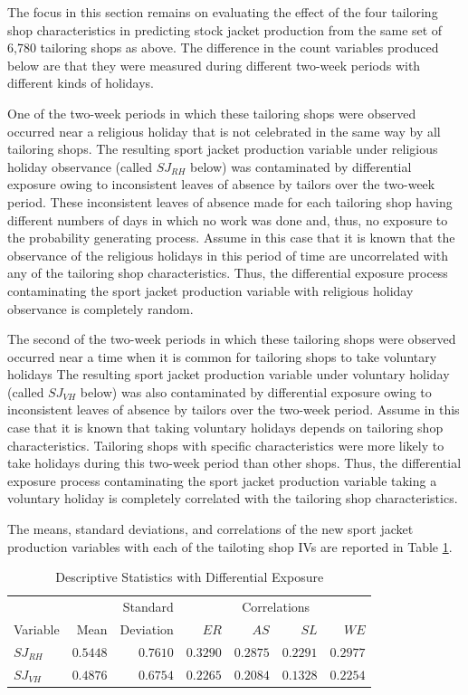 \documentclass[ShortAfour,times,sageapa]{sagej}
\begin{document}
	The focus in this section remains on evaluating the effect of the four tailoring shop characteristics in predicting stock jacket production from the same set of 6,780 tailoring shops as above. 
	The difference in the count variables produced below are that they were measured during different two-week periods with different kinds of holidays.
	
	One of the two-week periods in which these tailoring shops were observed occurred near a religious holiday that is not celebrated in the same way by all tailoring shops.
	The resulting sport jacket production variable under religious holiday observance (called $SJ_{RH}$ below) was contaminated by differential exposure owing to inconsistent leaves of absence by tailors over the two-week period.
	These inconsistent leaves of absence made for each tailoring shop having different numbers of days in which no work was done and, thus, no exposure to the probability generating process.
	Assume in this case that it is known that the observance of the religious holidays in this period of time are uncorrelated with any of the tailoring shop characteristics. 
	Thus, the differential exposure process contaminating the sport jacket production variable with religious holiday observance is completely random.
	
	The second of the two-week periods in which these tailoring shops were observed occurred near a time when it is common for tailoring shops to take voluntary holidays
	The resulting sport jacket production variable under voluntary holiday (called $SJ_{VH}$ below) was also contaminated by differential exposure owing to inconsistent leaves of absence by tailors over the two-week period.
	Assume in this case that it is known that taking voluntary holidays depends on tailoring shop characteristics.
	Tailoring shops with specific characteristics were more likely to take holidays during this two-week period than other shops.
	Thus, the differential exposure process contaminating the sport jacket production variable taking a voluntary holiday is completely correlated with the tailoring shop characteristics.
	
	The means, standard deviations, and correlations of the new sport jacket production variables with each of the tailoting shop IVs are reported in Table \ref{tab:dscEx}.
	
	\begin{table}[h!]
		\centering
		\caption{\centering Descriptive Statistics with Differential Exposure}
		\begin{tabular}{lrrrrrr}
			\toprule
			&  &  Standard & \multicolumn{4}{c}{Correlations} \\ 
			\cmidrule(lr){4-7}
			Variable & Mean & Deviation & $ER$ & $AS$ & $SL$ & $WE$ \\ 
			\midrule
			$SJ_{RH}$ & $0.5448$ & $0.7610$ & $0.3290$ & $0.2875$ & $0.2291$ & $0.2977$ \\  
			$SJ_{VH}$ & $0.4876$ & $0.6754$ & $0.2265$ & $0.2084$ & $0.1328$ & $0.2254$ \\
			\bottomrule
		\end{tabular}
		\label{tab:dscEx}
	\end{table}
	
\end{document}
